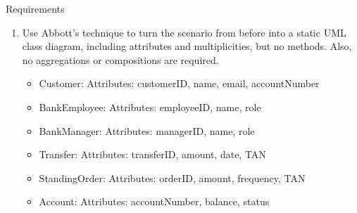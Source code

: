 \documentclass{article}
\begin{document}
\begin{exercise}{Requirements}
\begin{enumerate}
    \item Use Abbott's technique to turn the scenario from before into a static UML class diagram, including attributes and multiplicities, but no methods. Also, no aggregations or compositions are required. \begin{solution}
        \begin{itemize}
          \item Customer: Attributes: customerID, name, email, accountNumber
          \item BankEmployee: Attributes: employeeID, name, role
          \item BankManager: Attributes: managerID, name, role
          \item Transfer: Attributes: transferID, amount, date, TAN
          \item StandingOrder: Attributes: orderID, amount, frequency, TAN
          \item Account: Attributes: accountNumber, balance, status
        \end{itemize}
      \end{solution}
    \end{enumerate}
\end{exercise}
\end{document}
